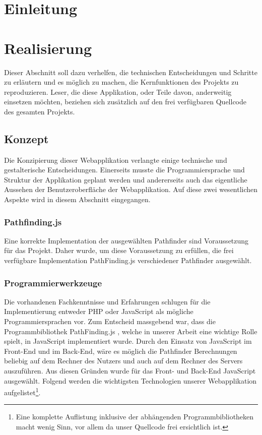 \documentclass[12pt,a4paper,german]{report}
\begin{document}




\tableofcontents{}


\chapter{Einleitung}

\chapter{Realisierung}
Dieser Abschnitt soll dazu verhelfen, die technischen Entscheidungen und Schritte zu erläutern und es möglich zu machen, die Kernfunktionen des Projekts zu reproduzieren. Leser, die diese Applikation, oder Teile davon, anderweitig einsetzen möchten, beziehen sich zusätzlich auf den frei verfügbaren Quellcode\cite{bma} des gesamten Projekts.
\section{Konzept}
Die Konzipierung dieser Webapplikation verlangte einige technische und gestalterische Entscheidungen. 
Einerseits musste die Programmiersprache und Struktur der Applikation geplant werden und andererseits auch das eigentliche Aussehen der Benutzeroberfläche der Webapplikation. 
Auf diese zwei wesentlichen Aspekte wird in diesem Abschnitt eingegangen.
\subsection{Pathfinding.js}
Eine korrekte Implementation der ausgewählten Pathfinder sind Voraussetzung für das Projekt. 
Daher wurde, um diese Voraussetzung zu erfüllen, die frei verfügbare Implementation PathFinding.js \cite{pfjs} verschiedener Pathfinder ausgewählt.
\subsection{Programmierwerkzeuge}
Die vorhandenen Fachkenntnisse und Erfahrungen schlugen für die Implementierung entweder PHP oder JavaScript als mögliche Programmiersprachen vor. 
Zum Entscheid massgebend war, dass die Programmbibliothek PathFinding.js \cite{pfjs}, welche in unserer Arbeit eine wichtige Rolle spielt, in JavaScript implementiert wurde. 
Durch den Einsatz von JavaScript im Front-End und im Back-End, wäre es möglich die Pathfinder Berechnungen beliebig auf dem Rechner des Nutzers und auch auf dem Rechner des Servers auszuführen. Aus diesen Gründen wurde für das Front- und Back-End JavaScript ausgewählt.
Folgend werden die wichtigsten Technologien unserer Webapplikation aufgelistet\footnote{Eine komplette Auflistung inklusive der abhängenden Programmbibliotheken macht wenig Sinn, vor allem da unser Quellcode frei ersichtlich ist.}.
\end{document}
